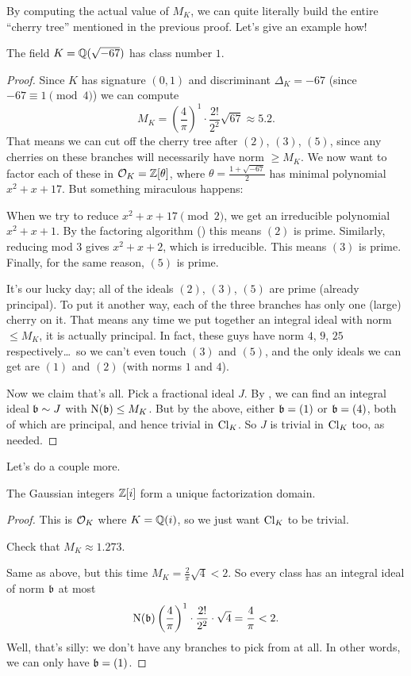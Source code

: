 By computing the actual value of $M_K$,
we can quite literally build the entire ``cherry tree'' mentioned in the previous proof.
Let's give an example how!
\begin{proposition}
	The field $K = \mathbb Q(\sqrt{-67})$ has class number $1$.
\end{proposition}
\begin{proof}
	Since $K$ has signature $(0,1)$ and discriminant $\Delta_K = -67$ (since $-67 \equiv 1 \pmod 4$)
	we can compute
	\[ M_K = \left( \frac 4\pi \right)^{1} \cdot \frac{2!}{2^2} \sqrt{67} \approx 5.2. \]
	That means we can cut off the cherry tree after $(2)$, $(3)$, $(5)$, since any
	cherries on these branches will necessarily have norm $\ge M_K$.
	We now want to factor each of these in $\mathcal O_K = \mathbb Z[\theta]$, where $\theta = \frac{1+\sqrt{-67}}{2}$
	has minimal polynomial $x^2 + x + 17$.
	But something miraculous happens:
	\begin{itemize}
		\ii When we try to reduce $x^2+x+17 \pmod 2$, we get an irreducible polynomial $x^2+x+1$.
		By the factoring algorithm () this means $(2)$ is prime.
		\ii Similarly, reducing mod $3$ gives $x^2+x+2$, which is irreducible.
		This means $(3)$ is prime.
		\ii Finally, for the same reason, $(5)$ is prime.
	\end{itemize}
	It's our lucky day; all of the ideals $(2)$, $(3)$, $(5)$ are prime (already principal).
	To put it another way, each of the three branches has only one (large) cherry on it.
	That means any time we put together an integral ideal with norm $\le M_K$,
	it is actually principal.
	In fact, these guys have norm $4$, $9$, $25$ respectively\dots\ so we can't even touch $(3)$ and $(5)$,
	and the only ideals we can get are $(1)$ and $(2)$ (with norms $1$ and $4$).

	Now we claim that's all.
	Pick a fractional ideal $J$.
	By , we can find an integral ideal $\mathfrak b \sim J$ with $\operatorname{N}(\mathfrak b) \le M_K$.
	But by the above, either $\mathfrak b = (1)$ or $\mathfrak b = (4)$, both of which are principal,
	and hence trivial in $\mathrm{Cl}_K$.
	So $J$ is trivial in $\mathrm{Cl}_K$ too, as needed.
\end{proof}
Let's do a couple more.
\begin{theorem}
	The Gaussian integers $\mathbb Z[i]$ form a unique factorization domain.
\end{theorem}
\begin{proof}
	This is $\mathcal O_K$ where $K = \mathbb Q(i)$, so we just want $\mathrm{Cl}_K$ to be trivial.
	\begin{ques}
		Check that $M_K \approx 1.273$.
	\end{ques}
	Same as above, but this time $M_K = \frac{2}{\pi}\sqrt{4} < 2$.
	So every class
	has an integral ideal of norm $\mathfrak b$ at most 
	\[ 
		\operatorname{N}(\mathfrak b)
		\left( \frac4\pi \right)^{1} \cdot \frac{2!}{2^2} \cdot \sqrt{4}
		= \frac4\pi < 2. 
	\]
	Well, that's silly: we don't have any branches to pick from at all.
	In other words, we can only have $\mathfrak b = (1)$.
\end{proof}

